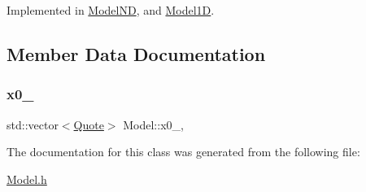 Implemented in \hyperlink{class_model_n_d_a62866814432b7c0a0d8f58223cc6279d}{Model\+ND}, and \hyperlink{class_model1_d_a08b3a9f594214b5e3bcba3fe5f63524e}{Model1D}.



\subsection{Member Data Documentation}
\hypertarget{class_model_aea7cb62b50849b8c9beef1493435241e}{}\label{class_model_aea7cb62b50849b8c9beef1493435241e} 
\subsubsection{\texorpdfstring{x0\+\_\+}{x0\_}}
{\footnotesize\ttfamily std\+::vector$<$\hyperlink{_name_def_8h_a642a6c5fd87319d922637de0e0bb0305}{Quote}$>$ Model\+::x0\+\_\+\hspace{0.3cm}{\ttfamily [mutable]}, {\ttfamily [protected]}}



The documentation for this class was generated from the following file\+:\begin{DoxyCompactItemize}
\item 
\hyperlink{_model_8h}{Model.\+h}\end{DoxyCompactItemize}
